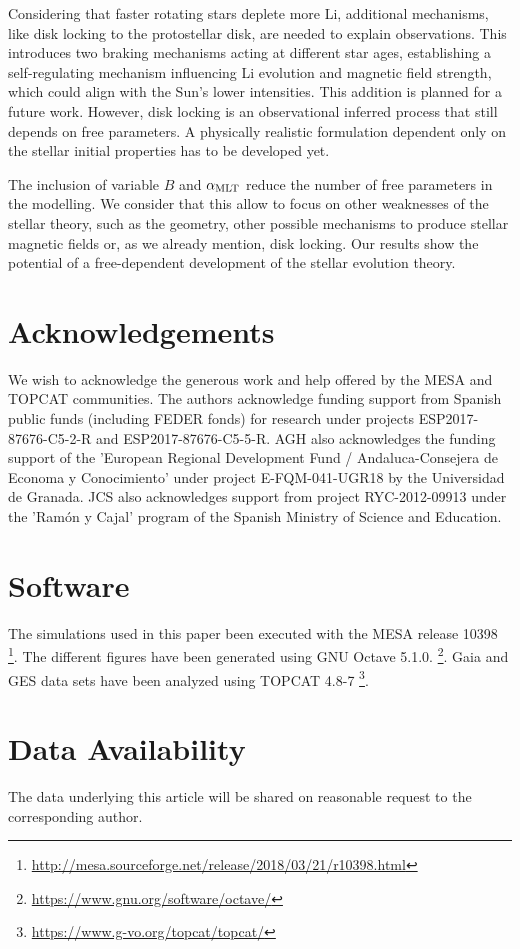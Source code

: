 \documentclass[fleqn,usenatbib]{mnras}
\begin{document}
Considering that faster rotating stars deplete more Li, additional mechanisms, like disk locking to the protostellar disk, are needed to explain observations. This introduces two braking mechanisms acting at different star ages, establishing a self-regulating mechanism influencing Li evolution and magnetic field strength, which could align with the Sun's lower intensities. This addition is planned for a future work. However, disk locking is an observational inferred process that still depends on free parameters. A physically realistic formulation dependent only on the stellar initial properties has to be developed yet.\par

The inclusion of variable $B$ and $\alpha_{\mathrm{MLT}}$ reduce the number of free parameters in the modelling. We consider that this allow to focus on other weaknesses of the stellar theory, such as the geometry, other possible mechanisms to produce stellar magnetic fields or, as we already mention, disk locking. Our results show the potential of a free-dependent development of the stellar evolution theory.

\section*{Acknowledgements}
We wish to acknowledge the generous work and help offered by the MESA and TOPCAT communities. The authors acknowledge funding support from Spanish public funds (including FEDER fonds) for research under projects ESP2017-87676-C5-2-R and ESP2017-87676-C5-5-R. AGH also acknowledges the funding support of the 'European Regional Development Fund / Andaluca-Consejera de Economa y Conocimiento' under project E-FQM-041-UGR18 by the Universidad de Granada. JCS also acknowledges support from project RYC-2012-09913 under the 'Ram\'on y Cajal' program of the Spanish Ministry of Science and Education.

\section*{Software}
The simulations used in this paper been executed with the MESA release 10398 \footnote{\url{http://mesa.sourceforge.net/release/2018/03/21/r10398.html}}. The different figures have been generated using GNU Octave 5.1.0. \footnote{\url{https://www.gnu.org/software/octave/}}.  Gaia and GES data sets have been analyzed using TOPCAT 4.8-7 \footnote{\url{https://www.g-vo.org/topcat/topcat/}}. 

\section*{Data Availability}
The data underlying this article will be shared on reasonable request to the corresponding author.
\end{document}
